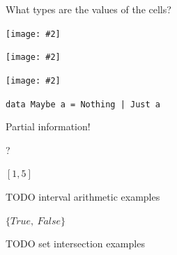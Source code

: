 \documentclass[usenames,dvipsnames,svgnames,table,aspectratio=1610,mathserif]{beamer}
\newcommand{\imageslide}[2][1]{{
\begin{frame}\begin{center}
\texttt{[image: \#2]}
\end{center}\end{frame}
}}
\begin{document}


\begin{frame}
\begin{center}
{\LARGE
What types are the values of the cells?
}
\end{center}
\end{frame}


\imageslide{diagrams/cell3.pdf}
\imageslide{diagrams/cell2.pdf}
\imageslide{diagrams/cell1.pdf}


\begin{frame}
\begin{center}
{\LARGE {\tt data Maybe a = Nothing | Just a}}
\end{center}
\end{frame}


\begin{frame}
\begin{center}
{\LARGE Partial information!}
\end{center}
\end{frame}


\begin{frame}
\begin{center}
\LARGE ?
\end{center}
\end{frame}


\begin{frame}
\begin{center}
\Huge $[1,5]$
\end{center}
\end{frame}


\begin{frame}
TODO interval arithmetic examples
\end{frame}


\begin{frame}
\begin{center}
\Huge $\{True,\ False\}$
\end{center}
\end{frame}


\begin{frame}
TODO set intersection examples
\end{frame}
\end{document}
